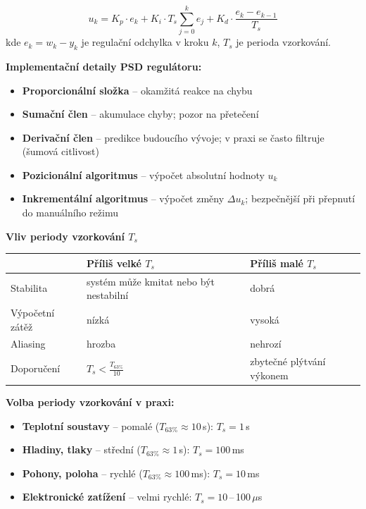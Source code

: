 \documentclass[a4paper,10pt]{article}
\begin{document}
\begin{vysvetlenibox}
\begin{vzorcebox}
$$u_k = K_p \cdot e_k
+ K_i \cdot T_s \sum_{j=0}^{k} e_j
+ K_d \cdot \frac{e_k - e_{k-1}}{T_s}$$
kde $e_k = w_k - y_k$ je regulační odchylka v kroku $k$,
$T_s$ je perioda vzorkování.
\end{vzorcebox}

\textbf{Implementační detaily PSD regulátoru:}
\begin{itemize}[noitemsep, leftmargin=1.4em, topsep=4pt]
    \item \textbf{Proporcionální složka} -- okamžitá reakce na chybu
    \item \textbf{Sumační člen} -- akumulace chyby; pozor na přetečení
    \item \textbf{Derivační člen} -- predikce budoucího vývoje;
          v praxi se často filtruje (šumová citlivost)
    \item \textbf{Pozicionální algoritmus} -- výpočet absolutní hodnoty $u_k$
    \item \textbf{Inkrementální algoritmus} -- výpočet změny $\Delta u_k$;
          bezpečnější při přepnutí do manuálního režimu
\end{itemize}

\textbf{Vliv periody vzorkování $T_s$}

\begin{center}
\begin{tabularx}{0.95\linewidth}{@{} l X X @{}}
    \toprule
    & \textbf{Příliš velké $T_s$} & \textbf{Příliš malé $T_s$} \\
    \midrule
    Stabilita     & systém může kmitat nebo být nestabilní & dobrá \\
    Výpočetní zátěž & nízká & vysoká \\
    Aliasing      & hrozba & nehrozí \\
    Doporučení    & $T_s < \frac{T_{63\%}}{10}$
                  & zbytečné plýtvání výkonem \\
    \bottomrule
\end{tabularx}
\end{center}

\textbf{Volba periody vzorkování v praxi:}
\begin{itemize}[noitemsep, leftmargin=1.4em, topsep=4pt]
    \item \textbf{Teplotní soustavy} -- pomalé ($T_{63\%} \approx 10$\,s): $T_s = 1$\,s
    \item \textbf{Hladiny, tlaky} -- střední ($T_{63\%} \approx 1$\,s): $T_s = 100$\,ms
    \item \textbf{Pohony, poloha} -- rychlé ($T_{63\%} \approx 100$\,ms): $T_s = 10$\,ms
    \item \textbf{Elektronické zatížení} -- velmi rychlé: $T_s = 10$\,--\,100\,$\mu$s
\end{itemize}


\end{vysvetlenibox}
\end{document}
